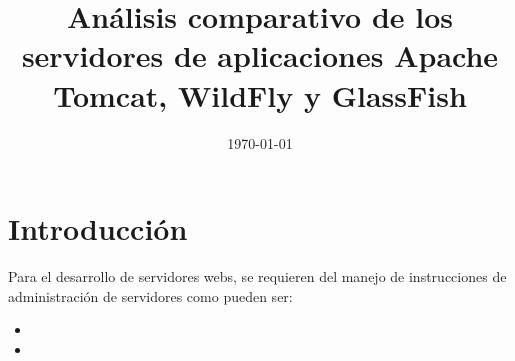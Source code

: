 \documentclass[12pt, aspectratio=169]{beamer} %
\title[Análisis de TC, WF y GF]{Análisis comparativo de los servidores de aplicaciones
Apache Tomcat, WildFly y GlassFish} %
\institute[UGR] %
{
  Universidad de Granada \\ %
}
\date{\today} %
\begin{document}
\begin{frame}
	\titlepage %
\end{frame}




\section{Introducción}
	\begin{frame}
		Para el desarrollo de servidores webs, se requieren del manejo de instrucciones de administración
		de servidores como pueden ser:
		
		\begin{itemize}
			\item {}
			

			\item {}
			
			

\end{itemize}
\end{frame}
\end{document}
